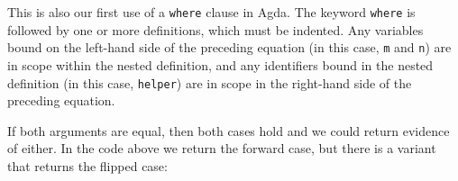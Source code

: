 This is also our first use of a \texttt{where} clause in Agda. The
keyword \texttt{where} is followed by one or more definitions, which
must be indented. Any variables bound on the left-hand side of the
preceding equation (in this case, \texttt{m} and \texttt{n}) are in
scope within the nested definition, and any identifiers bound in the
nested definition (in this case, \texttt{helper}) are in scope in the
right-hand side of the preceding equation.

If both arguments are equal, then both cases hold and we could return
evidence of either. In the code above we return the forward case, but
there is a variant that returns the flipped case:

\begin{fence}
\begin{code}%
\>[0]\AgdaSpace{}%
\AgdaSymbol{:}\AgdaSpace{}%
\AgdaSpace{}%
\AgdaSymbol{(}\AgdaSpace{}%
\AgdaSpace{}%
\AgdaSymbol{:}\AgdaSpace{}%
\AgdaSymbol{)}\AgdaSpace{}%
\AgdaSpace{}%
\AgdaSpace{}%
\AgdaSpace{}%
\<%
\\
\>[0]\AgdaSpace{}%
%
\>[17]%
\>[43]\AgdaSymbol{=}%
\>[46]\AgdaSpace{}%
\<%
\\
\>[0]\AgdaSpace{}%
%
\>[17]\AgdaSymbol{(}\AgdaSpace{}%
\AgdaSymbol{)}%
\>[43]\AgdaSymbol{=}%
\>[46]\AgdaSpace{}%
\<%
\\
\>[0]\AgdaSpace{}%
\AgdaSymbol{(}\AgdaSpace{}%
\AgdaSymbol{)}\AgdaSpace{}%
\AgdaSymbol{(}\AgdaSpace{}%
\AgdaSymbol{)}\AgdaSpace{}%
\AgdaSpace{}%
\AgdaSpace{}%
\AgdaSpace{}%
\<%
\\
\>[0]%
\>[27]\AgdaSymbol{|}\AgdaSpace{}%
\AgdaSpace{}%
%
\>[43]\AgdaSymbol{=}%
\>[46]\AgdaSpace{}%
\AgdaSymbol{(}\AgdaSpace{}%
\AgdaSymbol{)}\<%
\\
\>[0]%
\>[27]\AgdaSymbol{|}\AgdaSpace{}%
\AgdaSpace{}%
%
\>[43]\AgdaSymbol{=}%
\>[46]\AgdaSpace{}%
\AgdaSymbol{(}\AgdaSpace{}%
\AgdaSymbol{)}\<%
\end{code}
\end{fence}

